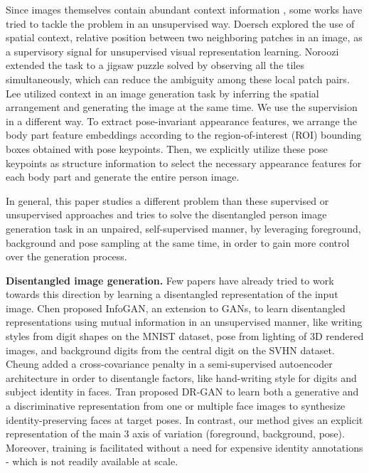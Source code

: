 \documentclass[10pt,twocolumn,letterpaper]{article}
\begin{document}
Since images themselves contain abundant context information \cite{SunCVPR17}, some works have tried to tackle the problem in an unsupervised way.
Doersch \etal \cite{doersch2015unsupervised} explored the use of spatial context, \ie relative position between two neighboring patches in an image, as a supervisory signal for unsupervised visual representation learning. 
Noroozi \etal \cite{noroozi2016unsupervised} extended the task to a jigsaw puzzle solved by observing all the tiles simultaneously, which can reduce the ambiguity among these local patch pairs.
Lee \etal \cite{lee2017unsupervised} utilized context in an image generation task by inferring the spatial arrangement and generating the image at the same time.
We use the supervision in a different way. 
To extract pose-invariant appearance features, we arrange the body part feature embeddings according to the region-of-interest (ROI) bounding boxes obtained with pose keypoints. 
Then, we explicitly utilize these pose keypoints as structure information to select the necessary appearance features for each body part and generate the entire person image.

In general, this paper studies a different problem than these supervised or unsupervised approaches and tries to solve the disentangled person image generation task in an unpaired, self-supervised manner, by leveraging foreground, background and pose sampling at the same time, in order to gain more control over the generation process.

\textbf{Disentangled image generation.}
Few papers have already tried to work towards this direction by learning a disentangled representation of the input image. 
Chen \etal \cite{chen2016infogan} proposed InfoGAN, an extension to GANs, to learn disentangled representations using mutual information in an unsupervised manner, like writing styles from digit shapes on the MNIST dataset, pose from lighting of 3D rendered images, and background digits from the central digit on the SVHN dataset.
Cheung \etal \cite{cheung2014discovering} added a cross-covariance penalty in a semi-supervised autoencoder architecture in order to disentangle factors, like hand-writing style for digits and subject identity in faces. 
Tran \etal \cite{tran2017disentangled} proposed DR-GAN to learn both a generative and a discriminative representation from one or multiple face images to synthesize identity-preserving faces at target poses.
In contrast, our method gives an explicit representation of the main 3 axis of variation (foreground, background, pose). 
Moreover, training is facilitated without a need for expensive identity annotations - which is not readily available at scale.
\end{document}
